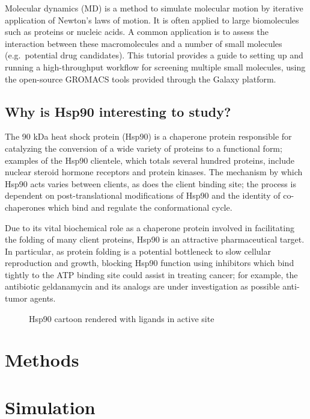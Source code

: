 \documentclass[twocolumn]{bmcart}%
\begin{document}
Molecular dynamics (MD) is a method to simulate molecular motion by
iterative application of Newton's laws of motion. It is often applied to
large biomolecules such as proteins or nucleic acids. A common
application is to assess the interaction between these macromolecules
and a number of small molecules (e.g.~potential drug candidates). This
tutorial provides a guide to setting up and running a high-throughput
workflow for screening multiple small molecules, using the open-source
GROMACS tools provided through the Galaxy platform.

\subsection*{Why is Hsp90 interesting to
study?}\label{why-is-hsp90-interesting-to-study}

The 90 kDa heat shock protein (Hsp90) is a chaperone protein responsible
for catalyzing the conversion of a wide variety of proteins to a
functional form; examples of the Hsp90 clientele, which totals several
hundred proteins, include nuclear steroid hormone receptors and protein
kinases. The mechanism by which Hsp90 acts varies between clients, as
does the client binding site; the process is dependent on
post-translational modifications of Hsp90 and the identity of
co-chaperones which bind and regulate the conformational cycle.

Due to its vital biochemical role as a chaperone protein involved in
facilitating the folding of many client proteins, Hsp90 is an attractive
pharmaceutical target. In particular, as protein folding is a potential
bottleneck to slow cellular reproduction and growth, blocking Hsp90
function using inhibitors which bind tightly to the ATP binding site
could assist in treating cancer; for example, the antibiotic
geldanamycin and its analogs are under investigation as possible
anti-tumor agents.

\begin{figure}[h!]
\caption{
    Hsp90 cartoon rendered with ligands in active site}
\centering
\label{fig:Hsp90}
\end{figure}

\hypertarget{methods}{%
\section*{Methods}\label{simulation}}
\hypertarget{simulation}{%
\section*{Simulation}\label{simulation}}
\end{document}
